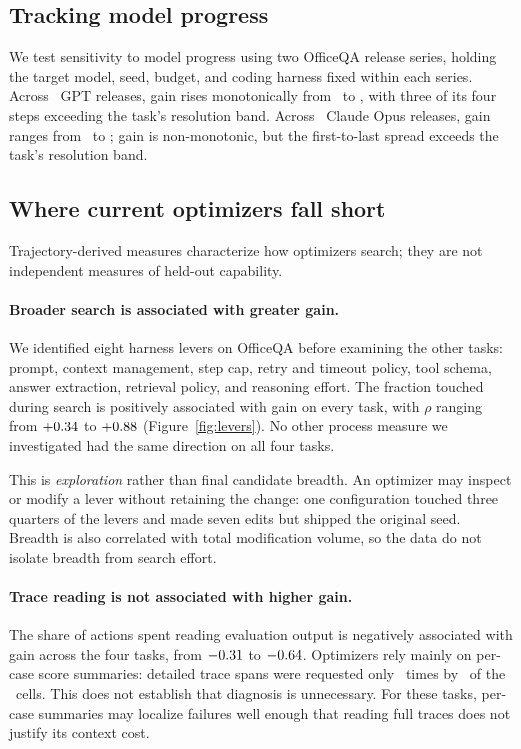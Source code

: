 \subsection{Tracking model progress}
\label{sec:ladder}

We test sensitivity to model progress using two OfficeQA release series, holding
the target model, seed, budget, and coding harness fixed within each series.
Across \NumLadderRungs\ GPT releases, gain rises monotonically from
\LadderGptLo\ to \LadderGptHi, with three of its four steps exceeding the task's
resolution band. Across \NumLadderRungs\ Claude Opus releases, gain ranges from
\LadderClaudeLo\ to \LadderClaudeHi; gain is non-monotonic, but the first-to-last spread exceeds the task's resolution band.


\subsection{Where current optimizers fall short}
\label{sec:process}

Trajectory-derived measures characterize how optimizers search; they are not
independent measures of held-out capability.

\paragraph{Broader search is associated with greater gain.}
We identified eight harness levers on OfficeQA before examining the other tasks:
prompt, context management, step cap, retry and timeout policy, tool schema,
answer extraction, retrieval policy, and reasoning effort. The fraction touched
during search is positively associated with gain on every task, with
$\rho$ ranging from $+0.34$ to $+0.88$
(Figure~\ref{fig:levers}). No other process measure we investigated had the same direction on
all four tasks.

This is \emph{exploration} rather than final candidate breadth. An optimizer may inspect or modify
a lever without retaining the change: one configuration touched three quarters
of the levers and made seven edits but shipped the original seed. Breadth is also
correlated with total modification volume, so the data do not isolate breadth
from search effort.


\paragraph{Trace reading is not associated with higher gain.}
The share of actions spent reading evaluation output is negatively associated
with gain across the four tasks, from $-0.31$ to $-0.64$.
Optimizers rely mainly on per-case score summaries: detailed trace spans were
requested only \NSpanCalls\ times by \NSpanCells\ of the
\NumScoredCells\ cells. This does not establish that diagnosis is unnecessary.
For these tasks, per-case summaries may localize failures well enough that reading
full traces does not justify its context cost.

